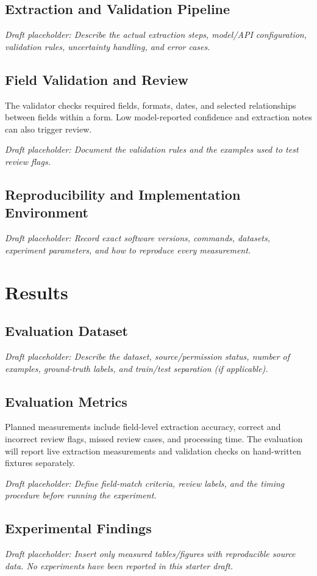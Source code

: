 \documentclass[11pt,letterpaper]{report}
\newcommand{\todowrite}[1]{\par\noindent\textit{Draft placeholder: #1}\par}
\begin{document}
\section{Extraction and Validation Pipeline}
\todowrite{Describe the actual extraction steps, model/API configuration, validation rules, uncertainty handling, and error cases.}

\section{Field Validation and Review}
The validator checks required fields, formats, dates, and selected relationships
between fields within a form. Low model-reported confidence and extraction
notes can also trigger review.
\todowrite{Document the validation rules and the examples used to test review flags.}

\section{Reproducibility and Implementation Environment}
\todowrite{Record exact software versions, commands, datasets, experiment parameters, and how to reproduce every measurement.}

\chapter{Results}
\section{Evaluation Dataset}
\todowrite{Describe the dataset, source/permission status, number of examples, ground-truth labels, and train/test separation (if applicable).}

\section{Evaluation Metrics}
Planned measurements include field-level extraction accuracy, correct and
incorrect review flags, missed review cases, and processing time. The evaluation
will report live extraction measurements and validation checks on hand-written
fixtures separately.
\todowrite{Define field-match criteria, review labels, and the timing procedure before running the experiment.}

\section{Experimental Findings}
\todowrite{Insert only measured tables/figures with reproducible source data. No experiments have been reported in this starter draft.}
\end{document}
